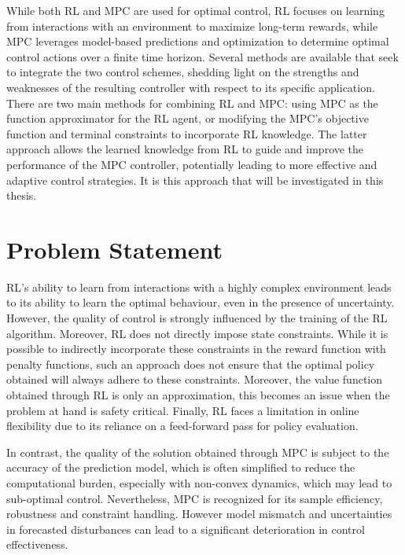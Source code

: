 While both RL and MPC are used for optimal control, RL focuses on learning from interactions with an environment to maximize long-term rewards, while MPC leverages model-based predictions and optimization to determine optimal control actions over a finite time horizon. Several methods are available that seek to integrate the two control schemes, shedding light on the strengths and weaknesses of the resulting controller with respect to its specific application. There are two main methods for combining RL and MPC: using MPC as the function approximator for the RL agent, or modifying the MPC's objective function and terminal constraints to incorporate RL knowledge. The latter approach allows the learned knowledge from RL to guide and improve the performance of the MPC controller, potentially leading to more effective and adaptive control strategies. It is this approach that will be investigated in this thesis.

\section{Problem Statement}

RL's ability to learn from interactions with a highly complex environment leads to its ability to learn the optimal behaviour, even in the presence of uncertainty. However, the quality of control is strongly influenced by the training of the RL algorithm. Moreover, RL does not directly impose state constraints. While it is possible to indirectly incorporate these constraints  in the reward function with penalty functions, such an approach does not ensure that the optimal policy obtained will always adhere to these constraints. Moreover, the value function obtained through RL is only an approximation, this becomes an issue when the problem at hand is safety critical. Finally, RL faces a limitation in online flexibility due to its reliance on a feed-forward pass for policy evaluation.

In contrast, the quality of the solution obtained through MPC is subject to the accuracy of the prediction model, which is often simplified to reduce the computational burden, especially with non-convex dynamics, which may lead to sub-optimal control. Nevertheless, MPC is recognized for its sample efficiency, robustness and constraint handling. However model mismatch and uncertainties in forecasted disturbances can lead to a significant deterioration in control effectiveness. 

